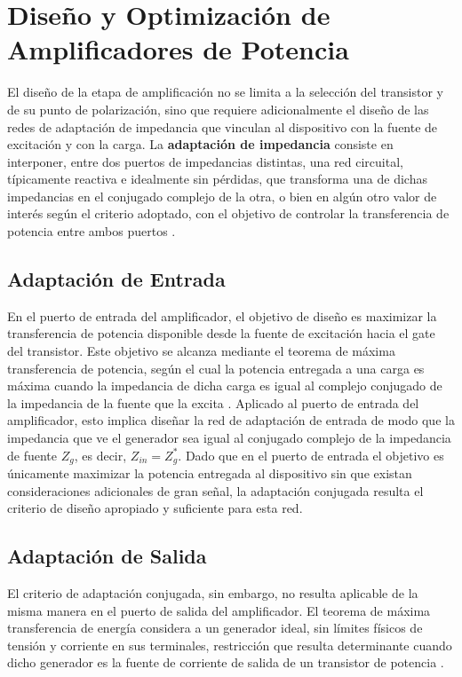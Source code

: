 \section{Diseño y Optimización de Amplificadores de Potencia}
El diseño de la etapa de amplificación no se limita a la selección del transistor y de su punto de polarización, sino que requiere adicionalmente el diseño de las redes de adaptación de impedancia que vinculan al dispositivo con la fuente de excitación y con la carga. La \textbf{adaptación de impedancia} consiste en interponer, entre dos puertos de impedancias distintas, una red circuital, típicamente reactiva e idealmente sin pérdidas, que transforma una de dichas impedancias en el conjugado complejo de la otra, o bien en algún otro valor de interés según el criterio adoptado, con el objetivo de controlar la transferencia de potencia entre ambos puertos \cite[Cap.~5]{pozar2011}.

\subsection{Adaptación de Entrada}
En el puerto de entrada del amplificador, el objetivo de diseño es maximizar la transferencia de potencia disponible desde la fuente de excitación hacia el gate del transistor. Este objetivo se alcanza mediante el teorema de máxima transferencia de potencia, según el cual la potencia entregada a una carga es máxima cuando la impedancia de dicha carga es igual al complejo conjugado de la impedancia de la fuente que la excita \cite[pp-76--78]{pozar2011}. Aplicado al puerto de entrada del amplificador, esto implica diseñar la red de adaptación de entrada de modo que la impedancia que ve el generador sea igual al conjugado complejo de la impedancia de fuente $Z_g$, es decir, $Z_{in} = Z_g^*$. Dado que en el puerto de entrada el objetivo es únicamente maximizar la potencia entregada al dispositivo sin que existan consideraciones adicionales de gran señal, la adaptación conjugada resulta el criterio de diseño apropiado y suficiente para esta red.

\subsection{Adaptación de Salida}
El criterio de adaptación conjugada, sin embargo, no resulta aplicable de la misma manera en el puerto de salida del amplificador. El teorema de máxima transferencia de energía considera a un generador ideal, sin límites físicos de tensión y corriente en sus terminales, restricción que resulta determinante cuando dicho generador es la fuente de corriente de salida de un transistor de potencia \cite[pp.11--14]{cripps2006}.

